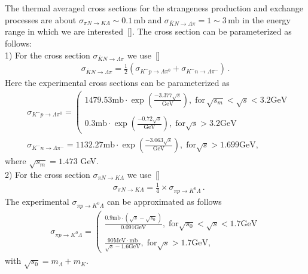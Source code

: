 The thermal averaged cross sections for the strangeness production and exchange processes are about $\sigma_{\pi N\rightarrow K\Lambda}\sim0.1\,\mathrm{mb}$ and $\sigma_{\overline{K}N\rightarrow \Lambda\pi}=1\sim3\,\mathrm{mb}$ in the energy range in which we are interested~[\cite{Koch:1986ud}]. The cross section can be parameterized as follows:\\
1) For the cross section $\sigma_{\overline{K}N\rightarrow \Lambda\pi}$ we use~[\cite{Koch:1986ud}]
 \begin{align}
 \sigma_{\overline{K}N\rightarrow \Lambda\pi}=\frac{1}{2}\left(\sigma_{K^-p\rightarrow \Lambda\pi^0}+\sigma_{K^-n\rightarrow \Lambda\pi^-}\right)\,.
\end{align}
Here the experimental cross sections can be parameterized as 
\begin{align}
&\sigma_{K^-p\rightarrow \Lambda\pi^0}\!\!=\!\!\left(\begin{array}{l}\!\!1479.53\mathrm{mb}\!\cdot\!\exp{\left(\frac{-3.377\sqrt{s}}{\mathrm{GeV}}\right)},\; \mathrm{for}\,\sqrt{s_m}\!\!<\!\!\sqrt{s}\!<\!3.2\mathrm{GeV} \\ \\0.3\mathrm{mb}\!\cdot\!\exp{\left(\frac{-0.72\sqrt{s}}{\mathrm{GeV}}\right)},\; \mathrm{for}\sqrt{s}>3.2\mathrm{GeV}\end{array}\right.\\
&\sigma_{K^-n\rightarrow \Lambda\pi^-}\!\!=\!\!1132.27\mathrm{mb}\!\cdot\!\exp{\left(\frac{-3.063\sqrt{s}}{\mathrm{GeV}}\right)},\; \mathrm{for}\sqrt{s}>1.699\mathrm{GeV},
\end{align}
where $\sqrt{s_m}=1.473$ GeV.\\
2) For the cross section $\sigma_{\pi N\rightarrow K\Lambda}$ we use~[\cite{Cugnon:1984pm}]
\begin{align}
&\sigma_{\pi N\rightarrow K\Lambda}=\frac{1}{4}\times\sigma_{\pi p\rightarrow K^0\Lambda}\,.
\end{align}
The experimental $\sigma_{\pi p\rightarrow K^0\Lambda}$  can be approximated as follows
\begin{align}
\sigma_{\pi p\rightarrow K^0\Lambda}=\left(\begin{array}{l}\frac{0.9\mathrm{mb}\cdot\left(\sqrt{s}-\sqrt{s_0}\right)}{0.091\mathrm{GeV}},\; \mathrm{for} \sqrt{s_0}<\sqrt{s}<1.7\mathrm{GeV} \\ \\ \frac{90\mathrm{MeV\cdot mb}}{\sqrt{s}-1.6\mathrm{GeV}},\; \mathrm{for}\sqrt{s}>1.7\mathrm{GeV},\end{array}\right.
 \end{align}
 with $ \sqrt{s_0}=m_\Lambda+m_K$. 

